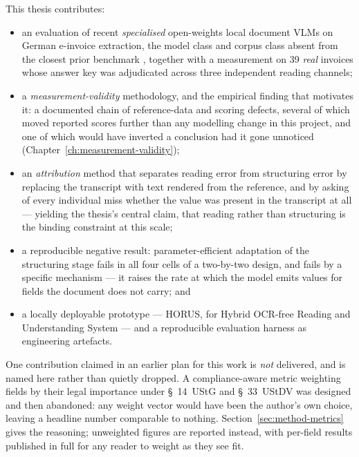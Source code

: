 This thesis contributes:

\begin{itemize}
  \item an evaluation of recent \emph{specialised} open-weights local document
        \acp{VLM} on German e-invoice extraction, the model class and corpus
        class absent from the closest prior benchmark \parencite{berghaus2025},
        together with a measurement on 39 \emph{real} invoices whose answer key
        was adjudicated across three independent reading channels;
  \item a \emph{measurement-validity} methodology, and the empirical finding that
        motivates it: a documented chain of reference-data and scoring defects,
        several of which moved reported scores further than any modelling change
        in this project, and one of which would have inverted a conclusion had it
        gone unnoticed (Chapter~\ref{ch:measurement-validity});
  \item an \emph{attribution} method that separates reading error from structuring
        error by replacing the transcript with text rendered from the reference,
        and by asking of every individual miss whether the value was present in
        the transcript at all --- yielding the thesis's central claim, that
        reading rather than structuring is the binding constraint at this scale;
  \item a reproducible negative result: parameter-efficient adaptation of the
        structuring stage fails in all four cells of a two-by-two design, and
        fails by a specific mechanism --- it raises the rate at which the model
        emits values for fields the document does not carry; and
  \item a locally deployable prototype --- HORUS, for Hybrid \ac{OCR}-free
        Reading and Understanding System --- and a reproducible evaluation
        harness as engineering artefacts.
\end{itemize}

\noindent One contribution claimed in an earlier plan for this work is
\emph{not} delivered, and is named here rather than quietly dropped. A
compliance-aware metric weighting fields by their legal importance under
\S~14~\ac{UStG} and \S~33~\ac{UStDV} was designed and then abandoned: any weight
vector would have been the author's own choice, leaving a headline number
comparable to nothing.
Section~\ref{sec:method-metrics} gives the reasoning; unweighted figures are
reported instead, with per-field results published in full for any reader to
weight as they see fit.

